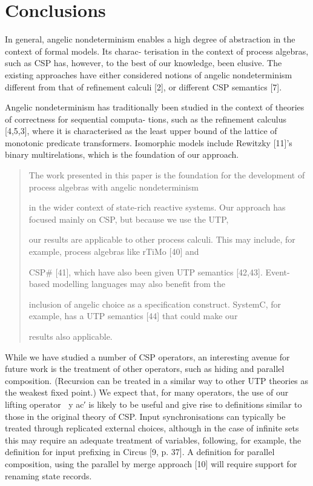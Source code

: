 \documentclass[11pt]{article}
\begin{document}
\section{Conclusions}
In general, angelic nondeterminism enables a high degree of abstraction in the context of formal models. Its charac- terisation in the context of process algebras, such as CSP has, however, to the best of our knowledge, been elusive. The existing approaches have either considered notions of angelic nondeterminism different from that of refinement calculi [2], or different CSP semantics [7].

Angelic nondeterminism has traditionally been studied in the context of theories of correctness for sequential computa- tions, such as the refinement calculus [4,5,3], where it is characterised as the least upper bound of the lattice of monotonic predicate transformers. Isomorphic models include Rewitzky [11]’s binary multirelations, which is the foundation of our approach.

\begin{quote}\small\raggedright
The work presented in this paper is the foundation for the development of process algebras with angelic nondeterminism
\par
in the wider context of state-rich reactive systems. Our approach has focused mainly on CSP, but because we use the UTP,
\par
our results are applicable to other process calculi. This may include, for example, process algebras like rTiMo [40] and
\par
CSP\# [41], which have also been given UTP semantics [42,43]. Event-based modelling languages may also benefit from the
\par
inclusion of angelic choice as a specification construct. SystemC, for example, has a UTP semantics [44] that could make our
\par
results also applicable.
\end{quote}

While we have studied a number of CSP operators, an interesting avenue for future work is the treatment of other operators, such as hiding and parallel composition. (Recursion can be treated in a similar way to other UTP theories as the weakest fixed point.) We expect that, for many operators, the use of our lifting operator ∈⃝y ac′ is likely to be useful and give rise to definitions similar to those in the original theory of CSP. Input synchronisations can typically be treated through replicated external choices, although in the case of infinite sets this may require an adequate treatment of variables, following, for example, the definition for input prefixing in Circus [9, p. 37]. A definition for parallel composition, using the parallel by merge approach [10] will require support for renaming state records.
\end{document}
